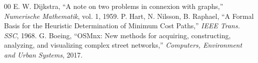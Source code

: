 \documentclass[conference]{IEEEtran}
\begin{document}

\begin{thebibliography}{00}
 E. W. Dijkstra, ``A note on two problems in connexion with graphs,'' \textit{Numerische Mathematik}, vol. 1, 1959.
 P. Hart, N. Nilsson, B. Raphael, ``A Formal Basis for the Heuristic Determination of Minimum Cost Paths,'' \textit{IEEE Trans. SSC}, 1968.
 G. Boeing, ``OSMnx: New methods for acquiring, constructing, analyzing, and visualizing complex street networks,'' \textit{Computers, Environment and Urban Systems}, 2017.
\end{thebibliography}
\end{document}
